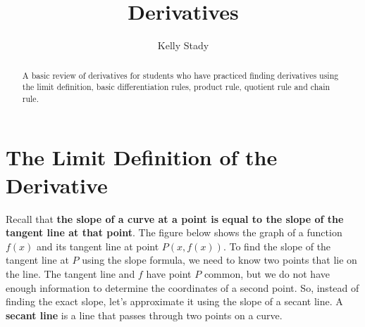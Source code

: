 \documentclass{ximera}
\title{Derivatives}   %
\author{Kelly Stady}
\begin{document}
\begin{abstract}
    A basic review of derivatives for students who have practiced finding derivatives using the limit definition, basic differentiation rules, product rule, quotient rule
    and chain rule.
\end{abstract}
\maketitle
\label{xim:Derivatives}


\section*{The Limit Definition of the Derivative}

Recall that \textbf{the slope of a curve at a point is equal to the slope of the tangent line at that point}.  The figure below shows the graph
of a function $f(x)$ and its tangent line at point $P (x, f(x)).$  To find the slope of the tangent line at $P$ using the slope formula, we need to 
know two points that lie on the line.  The tangent line and $f$ have point $P$ common, but we do not have enough information to determine the 
coordinates of a second point.  So, instead of finding the exact slope, let's approximate it using the slope of a secant line.  A \textbf{secant line} 
is a line that passes through two points on a curve.
\end{document}
